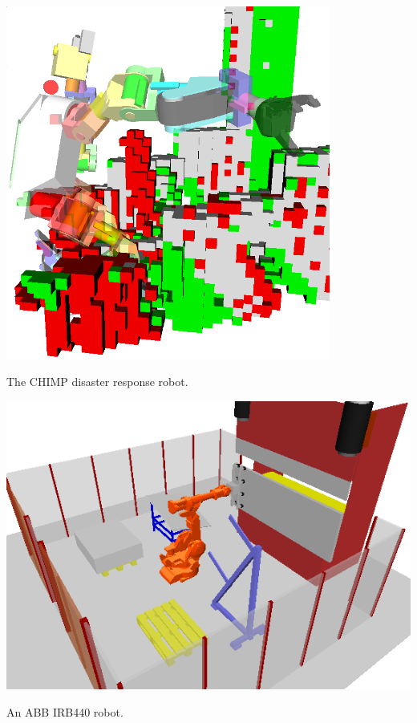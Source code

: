 \begin{marginfigure}
   \centering
   \includegraphics[width=0.8\textwidth]{figs/chimp-voxels-delta.png}
   \caption{The CHIMP disaster response robot.}
   \label{fig:intro:platform-chimp}
\end{marginfigure}

\begin{marginfigure}
   \centering
   \includegraphics[width=\textwidth]{figs/workcell/config-a.png}
   \caption{An ABB IRB440 robot.}
   \label{fig:intro:platform-irb4400}
\end{marginfigure}


